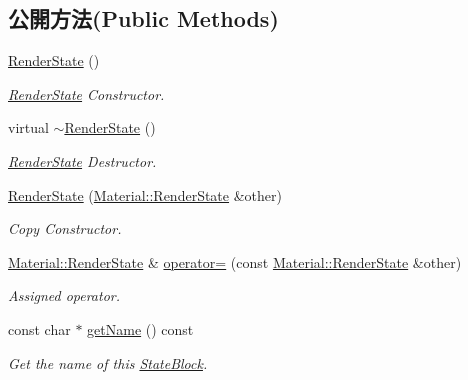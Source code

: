 \subsection*{公開方法(Public Methods)}
\begin{DoxyCompactItemize}
\item 
\hyperlink{class_i_dream_sky_1_1_material_1_1_render_state_aa126cdbda51ef9acb21df028a47ce1cc}{Render\+State} ()
\begin{DoxyCompactList}\small\item\em \hyperlink{class_i_dream_sky_1_1_material_1_1_render_state}{Render\+State} Constructor. \end{DoxyCompactList}\item 
virtual \hyperlink{class_i_dream_sky_1_1_material_1_1_render_state_ab7e62c5274ce7ff5cc54e4d1fc3469ce}{$\sim$\+Render\+State} ()
\begin{DoxyCompactList}\small\item\em \hyperlink{class_i_dream_sky_1_1_material_1_1_render_state}{Render\+State} Destructor. \end{DoxyCompactList}\item 
\hyperlink{class_i_dream_sky_1_1_material_1_1_render_state_ad18a28528f048e41e096b2d004811bd6}{Render\+State} (\hyperlink{class_i_dream_sky_1_1_material_1_1_render_state}{Material\+::\+Render\+State} \&other)
\begin{DoxyCompactList}\small\item\em Copy Constructor. \end{DoxyCompactList}\item 
\hyperlink{class_i_dream_sky_1_1_material_1_1_render_state}{Material\+::\+Render\+State} \& \hyperlink{class_i_dream_sky_1_1_material_1_1_render_state_afdca490ba7eebcc44bf86955ef9c92b1}{operator=} (const \hyperlink{class_i_dream_sky_1_1_material_1_1_render_state}{Material\+::\+Render\+State} \&other)
\begin{DoxyCompactList}\small\item\em Assigned operator. \end{DoxyCompactList}\item 
const char $\ast$ \hyperlink{class_i_dream_sky_1_1_material_1_1_render_state_ac969002d5e23b21c7ff2aeff1dd04332}{get\+Name} () const 
\begin{DoxyCompactList}\small\item\em Get the name of this \hyperlink{class_i_dream_sky_1_1_material_1_1_state_block}{State\+Block}. \end{DoxyCompactList}\item 

\end{DoxyCompactItemize}
